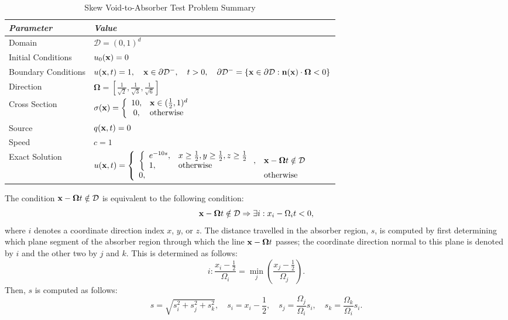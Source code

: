 \begin{table}[h]\caption{Skew Void-to-Absorber Test Problem Summary}
\label{tab:void_to_absorber_skew}
\centering
\begin{tabular}{l l}\toprule
\emph{Parameter} & \emph{Value}\\\midrule
Domain & $\mathcal{D} = (0,1)^d$\\
Initial Conditions & $u_0(\mathbf{x})=0$\\
Boundary Conditions & $u(\mathbf{x},t)=1,\quad \mathbf{x}\in\partial\mathcal{D}^-,\quad t>0,
   \quad\partial\mathcal{D}^-=\{\mathbf{x}\in\partial\mathcal{D}:\mathbf{n}(\mathbf{x})
   \cdot\mathbf{\Omega}<0\}$\\
Direction & $\mathbf{\Omega} = \left[\frac{1}{\sqrt{2}},\frac{1}{\sqrt{3}},
   \frac{1}{\sqrt{6}}\right]$\\
Cross Section & $\sigma(\mathbf{x})=\left\{\begin{array}{c l}
   10, & \mathbf{x}\in(\frac{1}{2},1)^d\\
   0,  & \mbox{otherwise}\end{array}\right.$\\
Source & $q(\mathbf{x},t)=0$\\
Speed & $c=1$\\
Exact Solution & $u(\mathbf{x},t)=\left\{\begin{array}{l l}
   \left\{\begin{array}{l l}
      e^{-10s}, & x\ge\frac{1}{2}, y\ge\frac{1}{2}, z\ge\frac{1}{2}\\
      1,        & \mbox{otherwise}
   \end{array}\right., & \mathbf{x}-\mathbf{\Omega}t\notin\mathcal{D}\\
   0, & \mbox{otherwise}
   \end{array}\right.$ \\
\bottomrule\end{tabular}
\end{table}

The condition $\mathbf{x}-\mathbf{\Omega}t\notin\mathcal{D}$ is equivalent to the
following condition:
\[
   \mathbf{x}-\mathbf{\Omega}t\notin\mathcal{D} \Rightarrow
   \exists i: x_i-\Omega_i t < 0,
\]
where $i$ denotes a coordinate direction index $x$, $y$, or $z$.
The distance travelled in the absorber region, $s$, is computed
by first determining which plane segment of the absorber region
through which the line $\mathbf{x}-\mathbf{\Omega}t$ passes; the coordinate
direction normal to this plane is denoted by $i$ and the other
two by $j$ and $k$. This is determined as follows:
\[
   i: \frac{x_i-\frac{1}{2}}{\Omega_i} = \min\limits_j\left(
      \frac{x_j-\frac{1}{2}}{\Omega_j}\right).
\]
Then, $s$ is computed as follows:
\[
   s=\sqrt{s_i^2 + s_j^2 + s_k^2}, \quad
   s_i=x_i-\frac{1}{2}, \quad
   s_j=\frac{\Omega_j}{\Omega_i}s_i, \quad
   s_k=\frac{\Omega_k}{\Omega_i}s_i.
\]
